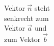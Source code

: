 \documentclass[preview]{standalone}
\begin{document}
\begin{center}
Vektor $\vec{n}$ steht \\senkrecht zum \\Vektor $\vec{a}$ und \\zum Vektor $\vec{b}$
\end{center}
\end{document}
